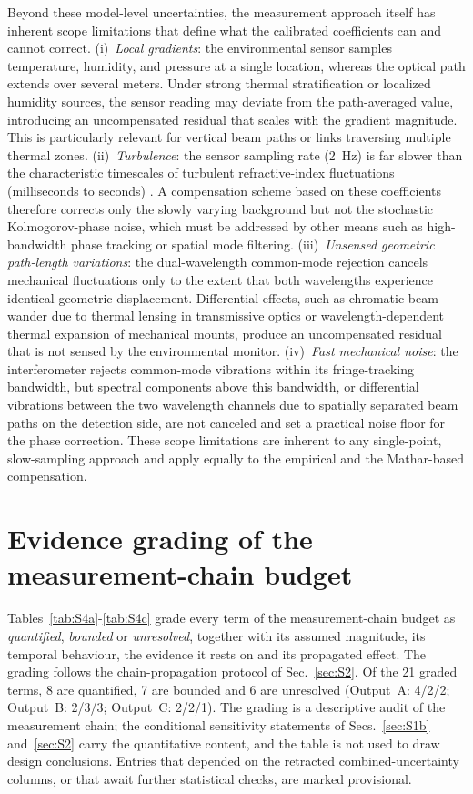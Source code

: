 \documentclass[aps,prapplied,reprint,superscriptaddress]{revtex4-2}
\begin{document}
Beyond these model-level uncertainties, the measurement approach itself has inherent scope limitations that define what the calibrated coefficients can and cannot correct. (i)~\textit{Local gradients}: the environmental sensor samples temperature, humidity, and pressure at a single location, whereas the optical path extends over several meters. Under strong thermal stratification or localized humidity sources, the sensor reading may deviate from the path-averaged value, introducing an uncompensated residual that scales with the gradient magnitude. This is particularly relevant for vertical beam paths or links traversing multiple thermal zones. (ii)~\textit{Turbulence}: the sensor sampling rate (\SI{2}{\hertz}) is far slower than the characteristic timescales of turbulent refractive-index fluctuations (milliseconds to seconds) \cite{tatarskii1961wave}. A compensation scheme based on these coefficients therefore corrects only the slowly varying background but not the stochastic Kolmogorov-phase noise, which must be addressed by other means such as high-bandwidth phase tracking or spatial mode filtering. (iii)~\textit{Unsensed geometric path-length variations}: the dual-wavelength common-mode rejection cancels mechanical fluctuations only to the extent that both wavelengths experience identical geometric displacement. Differential effects, such as chromatic beam wander due to thermal lensing in transmissive optics or wavelength-dependent thermal expansion of mechanical mounts, produce an uncompensated residual that is not sensed by the environmental monitor. (iv)~\textit{Fast mechanical noise}: the interferometer rejects common-mode vibrations within its fringe-tracking bandwidth, but spectral components above this bandwidth, or differential vibrations between the two wavelength channels due to spatially separated beam paths on the detection side, are not canceled and set a practical noise floor for the phase correction. These scope limitations are inherent to any single-point, slow-sampling approach and apply equally to the empirical and the Mathar-based compensation.

\section{Evidence grading of the measurement-chain budget}
\label{sec:S5}

Tables~\ref{tab:S4a}-\ref{tab:S4c} grade every term of the measurement-chain budget as \emph{quantified}, \emph{bounded} or \emph{unresolved}, together with its assumed magnitude, its temporal behaviour, the evidence it rests on and its propagated effect. The grading follows the chain-propagation protocol of Sec.~\ref{sec:S2}. Of the 21 graded terms, 8 are quantified, 7 are bounded and 6 are unresolved (Output~A: 4/2/2; Output~B: 2/3/3; Output~C: 2/2/1). The grading is a descriptive audit of the measurement chain; the conditional sensitivity statements of Secs.~\ref{sec:S1b} and~\ref{sec:S2} carry the quantitative content, and the table is not used to draw design conclusions. Entries that depended on the retracted combined-uncertainty columns, or that await further statistical checks, are marked provisional.
\end{document}
